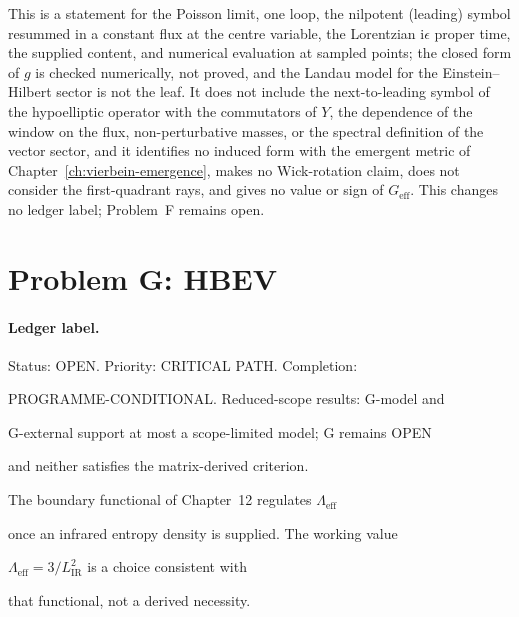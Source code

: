 This is a statement for the Poisson limit, one loop, the nilpotent (leading) symbol resummed in a constant flux at the centre variable, the Lorentzian \(\mathrm i\epsilon\) proper time, the supplied content, and numerical evaluation at sampled points; the closed form of \(g\) is checked numerically, not proved, and the Landau model for the Einstein--Hilbert sector is not the leaf. It does not include the next-to-leading symbol of the hypoelliptic operator with the commutators of \(Y\), the dependence of the window on the flux, non-perturbative masses, or the spectral definition of the vector sector, and it identifies no induced form with the emergent metric of Chapter~\ref{ch:vierbein-emergence}, makes no Wick-rotation claim, does not consider the first-quadrant rays, and gives no value or sign of \(G_{\mathrm{eff}}\). This changes no ledger label; Problem~F remains open.







\section{Problem G: HBEV}

\label{sec:detailed-Problem G: HBEV}



\paragraph{Ledger label.} \label{detail:sec-G-paragraphledgerlabel-38}

Status: OPEN. Priority: CRITICAL PATH. Completion:

PROGRAMME-CONDITIONAL. Reduced-scope results: G-model and

G-external support at most a scope-limited model; G remains OPEN

and neither satisfies the matrix-derived criterion.



The boundary functional of Chapter~12 regulates \(\Lambda_{\mathrm{eff}}\)

once an infrared entropy density is supplied. The working value

\(\Lambda_{\mathrm{eff}}=3/L_{\mathrm{IR}}^2\) is a choice consistent with

that functional, not a derived necessity.







